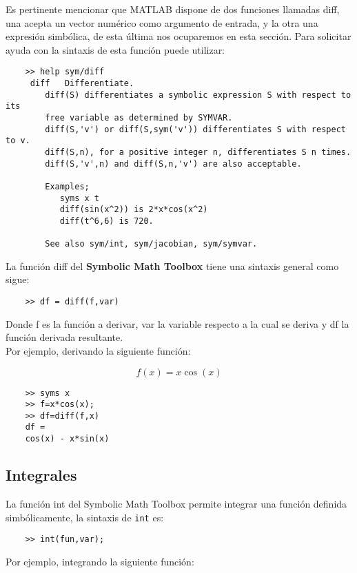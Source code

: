 Es pertinente mencionar que MATLAB dispone de dos funciones llamadas diff, una 
acepta un vector numérico como argumento de entrada, y la otra una expresión simbólica, 
de esta última nos ocuparemos en esta sección. Para solicitar ayuda con la sintaxis de 
esta función puede utilizar:

\begin{verbatim}
	>> help sym/diff
	 diff   Differentiate.
	    diff(S) differentiates a symbolic expression S with respect to its
	    free variable as determined by SYMVAR.
	    diff(S,'v') or diff(S,sym('v')) differentiates S with respect to v.
	    diff(S,n), for a positive integer n, differentiates S n times.
	    diff(S,'v',n) and diff(S,n,'v') are also acceptable.
	 
	    Examples;
	       syms x t
	       diff(sin(x^2)) is 2*x*cos(x^2)
	       diff(t^6,6) is 720.
	 
	    See also sym/int, sym/jacobian, sym/symvar.
\end{verbatim}

La función diff  del \textbf{Symbolic Math Toolbox} tiene una sintaxis general como sigue:

\begin{verbatim}
	>> df = diff(f,var)
\end{verbatim}

Donde f es la función a derivar, var la variable respecto a la cual se deriva y df 
la función derivada resultante.\\

Por ejemplo, derivando la siguiente función:

$$ f(x)=x\cos(x) $$

\begin{verbatim}
	>> syms x
	>> f=x*cos(x);
	>> df=diff(f,x)
	df =
	cos(x) - x*sin(x)
\end{verbatim}

\subsection{Integrales}

La función int  del Symbolic Math Toolbox permite integrar una función definida 
simbólicamente, la sintaxis de \texttt{int} es:

\begin{verbatim}
	>> int(fun,var);
\end{verbatim}

Por ejemplo, integrando la siguiente función:

